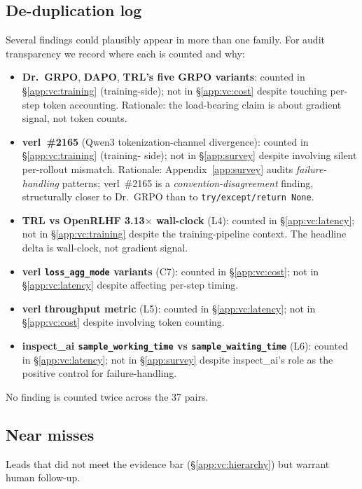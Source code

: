 \documentclass{article}
\begin{document}
\subsection{De-duplication log}
\label{app:vc:dedup}

Several findings could plausibly appear in more than one
family. For audit transparency we record where each is counted
and why:

\begin{itemize}
\item \textbf{Dr.\ GRPO}, \textbf{DAPO}, \textbf{TRL's five
GRPO variants}: counted in \S\ref{app:vc:training}
(training-side); not in \S\ref{app:vc:cost} despite touching
per-step token accounting. Rationale: the load-bearing claim is
about gradient signal, not token counts.
\item \textbf{verl~\#2165} (Qwen3 tokenization-channel
divergence): counted in \S\ref{app:vc:training} (training-%
side); not in \S\ref{app:survey} despite involving silent
per-rollout mismatch. Rationale: Appendix~\ref{app:survey}
audits \emph{failure-handling} patterns; verl~\#2165 is a
\emph{convention-disagreement} finding, structurally closer to
Dr.\ GRPO than to \texttt{try/except/return None}.
\item \textbf{TRL vs OpenRLHF 3.13$\times$ wall-clock} (L4):
counted in \S\ref{app:vc:latency}; not in
\S\ref{app:vc:training} despite the training-pipeline context.
The headline delta is wall-clock, not gradient signal.
\item \textbf{verl \texttt{loss\_agg\_mode} variants} (C7):
counted in \S\ref{app:vc:cost}; not in \S\ref{app:vc:latency}
despite affecting per-step timing.
\item \textbf{verl throughput metric} (L5): counted in
\S\ref{app:vc:latency}; not in \S\ref{app:vc:cost} despite
involving token counting.
\item \textbf{inspect\_ai \texttt{sample\_working\_time} vs
\texttt{sample\_waiting\_time}} (L6): counted in
\S\ref{app:vc:latency}; not in \S\ref{app:survey} despite
inspect\_ai's role as the positive control for
failure-handling.
\end{itemize}
No finding is counted twice across the 37 pairs.

\subsection{Near misses}
\label{app:vc:nearmisses}

Leads that did not meet the evidence bar
(\S\ref{app:vc:hierarchy}) but warrant human follow-up.
\end{document}
